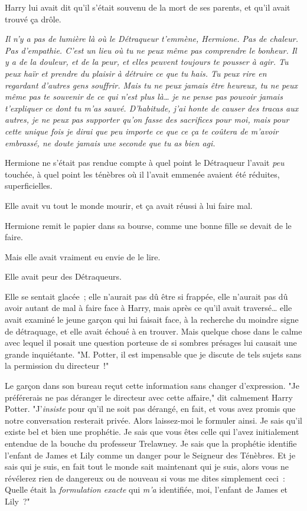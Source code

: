 Harry lui avait dit qu'il s'était souvenu de la mort de ses parents, et qu'il avait trouvé ça drôle.

\emph{Il n'y a pas de lumière là où le Détraqueur t'emmène, Hermione. Pas de chaleur. Pas d'empathie. C'est un lieu où tu ne peux même pas comprendre le bonheur. Il y a de la douleur, et de la peur, et elles peuvent toujours te pousser à agir. Tu peux haïr et prendre du plaisir à détruire ce que tu hais. Tu peux rire en regardant d'autres gens souffrir. Mais tu ne peux jamais être heureux, tu ne peux même pas te souvenir de ce qui n'est plus là… je ne pense pas pouvoir jamais t'expliquer ce dont tu m'as sauvé. D'habitude, j'ai honte de causer des tracas aux autres, je ne peux pas supporter qu'on fasse des sacrifices pour moi, mais pour cette unique fois je dirai que peu importe ce que ce ça te coûtera de m'avoir embrassé, ne doute jamais une seconde que tu as bien agi.}

Hermione ne s'était pas rendue compte à quel point le Détraqueur l'avait \emph{peu} touchée, à quel point les ténèbres où il l'avait emmenée avaient été réduites, superficielles.

Elle avait vu tout le monde mourir, et ça avait réussi à lui faire mal.

Hermione remit le papier dans sa bourse, comme une bonne fille se devait de le faire.

Mais elle avait vraiment eu envie de le lire.

Elle avait peur des Détraqueurs.


Elle se sentait glacée~; elle n'aurait pas dû être si frappée, elle n'aurait pas dû avoir autant de mal à faire face à Harry, mais après ce qu'il avait traversé… elle avait examiné le jeune garçon qui lui faisait face, à la recherche du moindre signe de détraquage, et elle avait échoué à en trouver. Mais quelque chose dans le calme avec lequel il posait une question porteuse de si sombres présages lui causait une grande inquiétante. "M. Potter, il est impensable que je discute de tels sujets sans la permission du directeur~!"

Le garçon dans son bureau reçut cette information sans changer d'expression. "Je préférerais ne pas déranger le directeur avec cette affaire," dit calmement Harry Potter. "J'\emph{insiste} pour qu'il ne soit pas dérangé, en fait, et vous avez promis que notre conversation resterait privée. Alors laissez-moi le formuler ainsi. Je sais qu'il existe bel et bien une prophétie. Je sais que vous êtes celle qui l'avez initialement entendue de la bouche du professeur Trelawney. Je sais que la prophétie identifie l'enfant de James et Lily comme un danger pour le Seigneur des Ténèbres. Et je sais qui je suis, en fait tout le monde sait maintenant qui je suis, alors vous ne révélerez rien de dangereux ou de nouveau si vous me dites simplement ceci~: Quelle était la \emph{formulation exacte} qui \emph{m'a} identifiée, moi, l'enfant de James et Lily~?"

